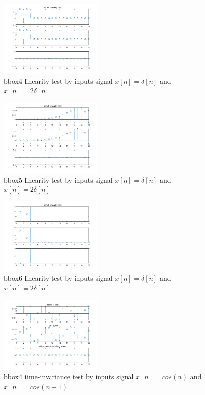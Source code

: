 \documentclass[journal]{IEEEtran}
\begin{document}
\begin{figure}[H]
   \centering
   \includegraphics[width=0.45\textwidth]{2.7.1.png} %
   \caption{bbox4 linearity test by inputs signal $x[n]=\delta[n]$ and $x[n]=2\delta[n]$}
   \label{fig:2.7.1}
\end{figure}
\begin{figure}[H]
   \centering
   \includegraphics[width=0.45\textwidth]{2.7.2.png} %
   \caption{bbox5 linearity test by inputs signal $x[n]=\delta[n]$ and $x[n]=2\delta[n]$}
   \label{fig:2.7.2}
\end{figure}
\begin{figure}[H]
   \centering
   \includegraphics[width=0.45\textwidth]{2.7.3.png} %
   \caption{bbox6 linearity test by inputs signal $x[n]=\delta[n]$ and $x[n]=2\delta[n]$}
   \label{fig:2.7.3}
\end{figure}
\begin{figure}[H]
   \centering
   \includegraphics[width=0.45\textwidth]{2.7.4.png} %
   \caption{bbox4 time-invariance test by inputs signal $x[n]=cos(n)$ and $x[n]=cos(n-1)$}
   \label{fig:2.7.4}
\end{figure}
\end{document}
